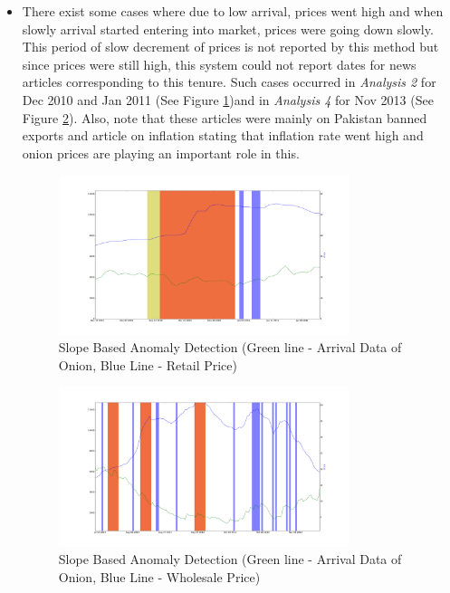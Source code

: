 \documentclass[a4paper,10pt]{report}
\begin{document}
\begin{itemize}
			\item There exist some cases where due to low arrival, prices went high and when slowly arrival started entering into market, prices were going down slowly. This period of slow decrement of prices is not reported by this method but since prices were still high, this system could not report dates for news articles corresponding to this tenure. Such cases occurred in \textit{Analysis 2} for Dec 2010 and Jan 2011 (See Figure \ref{fig:12124})and in \textit{Analysis 4} for Nov 2013 (See Figure \ref{fig:12144}). Also, note that these articles were mainly on Pakistan banned exports and article on inflation stating that inflation rate went high and onion prices are playing an important role in this.
			
			\begin{figure}[H]
		    	\centering
  		    	\includegraphics[width=0.8\textwidth]{graphs/12124.png}
		    	\caption{Slope Based Anomaly Detection (Green line - Arrival Data of Onion, Blue Line - Retail Price)}
		    	\label{fig:12124}
			\end{figure}
			
			\begin{figure}[H]
		    	\centering
  		    	\includegraphics[width=0.8\textwidth]{graphs/12144.png}
		    	\caption{Slope Based Anomaly Detection (Green line - Arrival Data of Onion, Blue Line - Wholesale Price)}
		    	\label{fig:12144}
			\end{figure}
			

\end{itemize}
\end{document}
